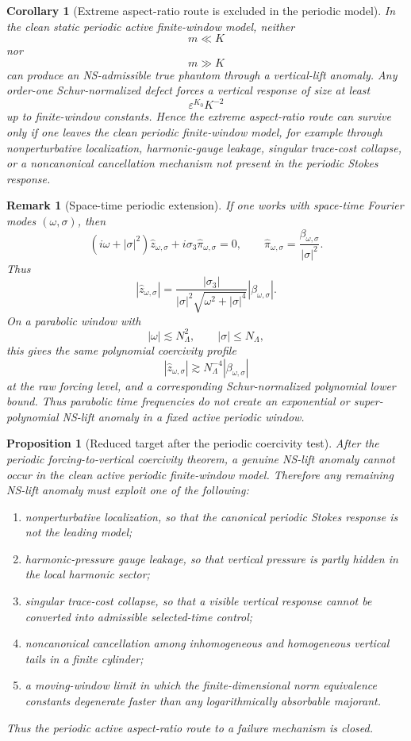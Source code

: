 \documentclass[11pt]{article}
\numberwithin{equation}{section}
\newtheorem{proposition}[theorem]{Proposition}
\newtheorem{corollary}[theorem]{Corollary}
\newtheorem{remark}[theorem]{Remark}
\begin{document}
\begin{corollary}[Extreme aspect-ratio route is excluded in the periodic model]
In the clean static periodic active finite-window model, neither
\[
m\ll K
\]
nor
\[
m\gg K
\]
can produce an NS-admissible true phantom through a vertical-lift anomaly. Any order-one Schur-normalized defect forces a vertical response of size at least
\[
\varepsilon^{K_0}K^{-2}
\]
up to finite-window constants. Hence the extreme aspect-ratio route can survive only if one leaves the clean periodic finite-window model, for example through nonperturbative localization, harmonic-gauge leakage, singular trace-cost collapse, or a noncanonical cancellation mechanism not present in the periodic Stokes response.
\end{corollary}

\begin{remark}[Space-time periodic extension]
If one works with space-time Fourier modes \((\omega,\sigma)\), then
\[
(i\omega+|\sigma|^2)\widehat z_{\omega,\sigma}
+
i\sigma_3\widehat\pi_{\omega,\sigma}=0,
\qquad
\widehat\pi_{\omega,\sigma}=\frac{\beta_{\omega,\sigma}}{|\sigma|^2}.
\]
Thus
\[
|\widehat z_{\omega,\sigma}| =
\frac{|\sigma_3|}{|\sigma|^2\sqrt{\omega^2+|\sigma|^4}}
|\beta_{\omega,\sigma}|.
\]
On a parabolic window with
\[
|\omega|\lesssim N_\Lambda^2,
\qquad
|\sigma|\le N_\Lambda,
\]
this gives the same polynomial coercivity profile
\[
|\widehat z_{\omega,\sigma}|
\gtrsim
N_\Lambda^{-4}|\beta_{\omega,\sigma}|
\]
at the raw forcing level, and a corresponding Schur-normalized polynomial lower bound. Thus parabolic time frequencies do not create an exponential or super-polynomial NS-lift anomaly in a fixed active periodic window.
\end{remark}

\begin{proposition}[Reduced target after the periodic coercivity test]
After the periodic forcing-to-vertical coercivity theorem, a genuine NS-lift anomaly cannot occur in the clean active periodic finite-window model. Therefore any remaining NS-lift anomaly must exploit one of the following:

\begin{enumerate}
\item nonperturbative localization, so that the canonical periodic Stokes response is not the leading model;
\item harmonic-pressure gauge leakage, so that vertical pressure is partly hidden in the local harmonic sector;
\item singular trace-cost collapse, so that a visible vertical response cannot be converted into admissible selected-time control;
\item noncanonical cancellation among inhomogeneous and homogeneous vertical tails in a finite cylinder;
\item a moving-window limit in which the finite-dimensional norm equivalence constants degenerate faster than any logarithmically absorbable majorant.
\end{enumerate}

Thus the periodic active aspect-ratio route to a failure mechanism is closed.
\end{proposition}
\end{document}
